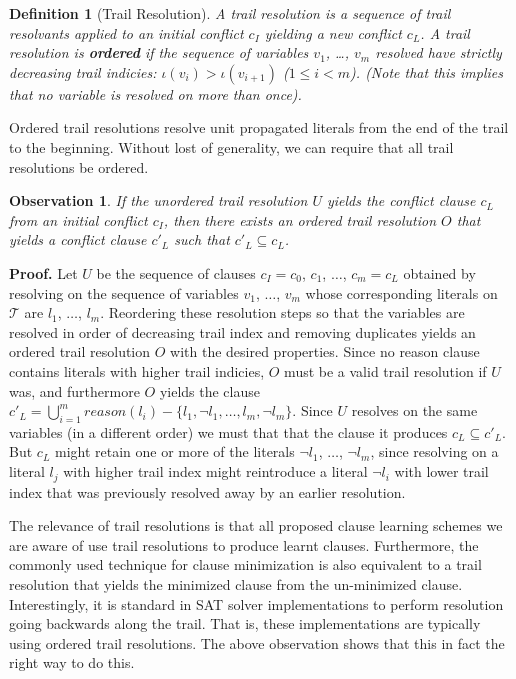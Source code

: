 \documentclass[runningheads]{llncs}
\newcommand{\sat}{SAT\xspace}
\newcommand{\trail}{\ensuremath{\mathcal{T}}}
\newcommand{\trailIdx}[1]{\ensuremath{\iota(#1)}}
\newcommand{\reason}[1]{\ensuremath{\mathit{reason}(#1)}}
\newtheorem{Obs}{Observation}
\newtheorem{defn}{Definition}
\newcommand{\whitebox}{\raisebox{.5ex}{\fbox{\hspace*{.2ex}}}}
\begin{document}
\begin{defn}[Trail Resolution]
    A trail resolution is a sequence of trail resolvants applied to an
    initial conflict $c_I$ yielding a new conflict $c_L$.  A trail
    resolution is \textbf{ordered} if the sequence of variables $v_1$,
    \dots, $v_m$ resolved have strictly decreasing trail indicies:
    $\trailIdx{v_i} > \trailIdx{v_{i+1}}$ ($1\leq i < m$). (Note that
    this implies that no variable is resolved on more than once).
\end{defn}

Ordered trail resolutions resolve unit propagated literals from the
end of the trail to the beginning. Without lost of generality, we can
require that all trail resolutions be ordered.

\begin{Obs}
    If the unordered trail resolution $U$ yields the conflict clause
    $c_L$ from an initial conflict $c_I$, then there exists an ordered
    trail resolution $O$ that yields a conflict clause $c'_L$ such
    that $c'_L\subseteq c_L$.
\end{Obs}
\noindent
\textbf{Proof.} Let $U$ be the sequence of clauses $c_I = c_0$, $c_1$,
$\ldots$, $c_m= c_L$ obtained by resolving on the sequence of
variables $v_1$, $\ldots$, $v_m$ whose corresponding literals on
$\trail$ are $l_1$, $\ldots$, $l_m$. Reordering these resolution steps
so that the variables are resolved in order of decreasing trail index
and removing duplicates yields an ordered trail resolution $O$ with
the desired properties. Since no reason clause contains literals with
higher trail indicies, $O$ must be a valid trail resolution if $U$
was, and furthermore $O$ yields the clause
$c'_L = \bigcup_{i=1}^m \reason{l_i} - \{l_1, \lnot l_1, \ldots, l_m,
\lnot l_m\}$. Since $U$ resolves on the same variables (in a different
order) we must that that the clause it produces $c_L\subseteq
c'_L$. But $c_L$ might retain one or more of the literals $\lnot l_1$,
$\ldots$, $\lnot l_m$, since resolving on a literal $l_j$ with higher
trail index might reintroduce a literal $\lnot l_i$ with lower trail
index that was previously resolved away by an earlier resolution.
\whitebox

The relevance of trail resolutions is that all proposed clause
learning schemes we are aware of use trail resolutions to produce
learnt clauses. Furthermore, the commonly used technique for clause
minimization \cite{DBLP:conf/sat/SorenssonB09} is also equivalent to a
trail resolution that yields the minimized clause from the
un-minimized clause. Interestingly, it is standard in \sat solver
implementations to perform resolution going backwards along the
trail. That is, these implementations are typically using ordered
trail resolutions. The above observation shows that this in fact the
right way to do this.
\end{document}
